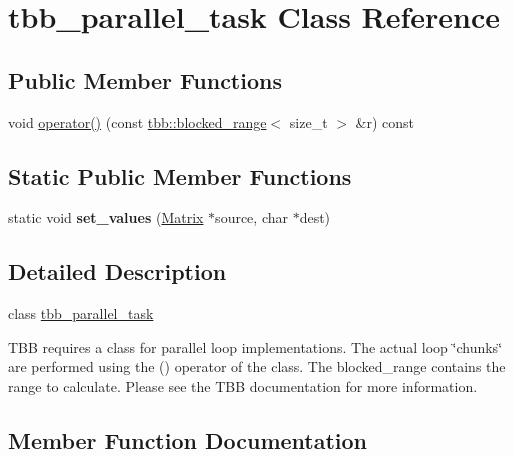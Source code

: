 \hypertarget{classtbb__parallel__task}{}\section{tbb\+\_\+parallel\+\_\+task Class Reference}
\label{classtbb__parallel__task}
\subsection*{Public Member Functions}
\begin{DoxyCompactItemize}
\item 
void \hyperlink{classtbb__parallel__task_ac08b9ab0902ef02003d366461a31f8f7}{operator()} (const \hyperlink{classtbb_1_1blocked__range}{tbb\+::blocked\+\_\+range}$<$ size\+\_\+t $>$ \&r) const 
\end{DoxyCompactItemize}
\subsection*{Static Public Member Functions}
\begin{DoxyCompactItemize}
\item 
\hypertarget{classtbb__parallel__task_ae8d20326cac7e305c07f0bdddaa51a5a}{}static void {\bfseries set\+\_\+values} (\hyperlink{classMatrix}{Matrix} $\ast$source, char $\ast$dest)\label{classtbb__parallel__task_ae8d20326cac7e305c07f0bdddaa51a5a}

\end{DoxyCompactItemize}


\subsection{Detailed Description}
class \hyperlink{classtbb__parallel__task}{tbb\+\_\+parallel\+\_\+task}

T\+B\+B requires a class for parallel loop implementations. The actual loop \char`\"{}chunks\char`\"{} are performed using the () operator of the class. The blocked\+\_\+range contains the range to calculate. Please see the T\+B\+B documentation for more information. 

\subsection{Member Function Documentation}
\hypertarget{classtbb__parallel__task_ac08b9ab0902ef02003d366461a31f8f7}{}
